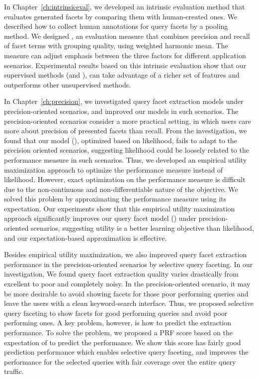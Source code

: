 In Chapter~\ref{ch:intrinsiceval}, we developed an intrinsic evaluation method that evaluates generated facets by comparing them with human-created ones. We described how to collect human annotations for query facets by a pooling method. We designed \PRF, an evaluation measure that combines precision and recall of facet terms with grouping quality, using weighted harmonic mean. The measure can adjust emphasis between the three factors for different application scenarios. Experimental results based on this intrinsic evaluation show that our supervised methods (\QFI and \QFJ), can take advantage of a richer set of features and outperforms other unsupervised methods.

In Chapter~\ref{ch:precision}, we investigated query facet extraction models under precision-oriented scenarios, and improved our models in such scenarios. The precision-oriented scenarios consider a more practical setting, in which users care more about precision of presented facets than recall. From the investigation, we found that our model (\QFJ), optimized based on likelihood, fails to adapt to the precision oriented scenarios, suggesting likelihood could be loosely related to the performance measure in such scenarios. Thus, we developed an empirical utility maximization approach to optimize the performance measure instead of likelihood. However, exact optimization on the performance measure is difficult due to the non-continuous and non-differentiable nature of the objective. We solved this problem by approximating the performance measure using its expectation. Our experiments show that this empirical utility maximization approach significantly improves our query facet model (\QFJ) under precision-
oriented scenarios, suggesting utility is a better learning objective than likelihood, and our expectation-based approximation is effective. 
 
Besides empirical utility maximization, we also improved query facet extraction performance in the precision-oriented scenarios by selective query faceting. In our investigation, We found query facet extraction quality varies drastically from excellent to poor and completely noisy. In the precision-oriented scenario, it may be more desirable to avoid showing facets for those poor performing queries and leave the users with a clean keyword-search interface. Thus, we proposed selective query faceting to show facets for good performing queries and avoid poor performing ones. A key problem, however, is how to predict the extraction performance. To solve the problem, we proposed a PRF score based on the expectation of \PRF to predict the performance. We show this score has fairly good prediction performance which enables selective query faceting, and improves the performance for the selected queries with fair coverage over the entire query traffic.

